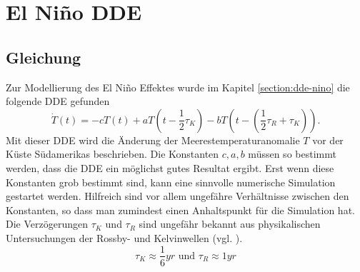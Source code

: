 \section{El Niño DDE}


\subsection{Gleichung}
Zur Modellierung des El Niño Effektes wurde im Kapitel \ref{section:dde-nino} die folgende DDE gefunden
\begin{equation} \label{eldde}
\dot{T}(t)=-cT(t)+aT(t-\frac{1}{2}\tau_K)-bT(t-(\frac{1}{2}\tau_R+\tau_K)).
\end{equation}
Mit dieser DDE wird die Änderung der Meerestemperaturanomalie $T$ vor der Küste Südamerikas beschrieben.
Die Konstanten $c,a,b$ müssen so bestimmt werden, dass die DDE ein möglichst gutes Resultat ergibt.
Erst wenn diese Konstanten grob bestimmt sind, kann eine sinnvolle numerische Simulation gestartet werden.
Hilfreich sind vor allem ungefähre Verhältnisse zwischen den Konstanten, so dass man zumindest einen Anhaltspunkt für die Simulation hat.
Die Verzögerungen $\tau_K$ und $\tau_R$ sind ungefähr bekannt aus physikalischen Untersuchungen der Rossby- und Kelvinwellen (vgl. \cite[Kaper]{verzoegert:kaperengler}).
\begin{equation}
	\tau_K \approx \frac{1}{6}yr \text{ und } \tau_R \approx 1 yr
\end{equation}


